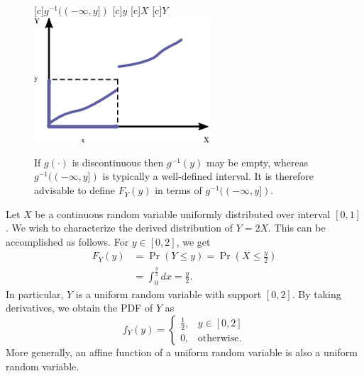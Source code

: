 \begin{figure}[ht]
\begin{center}
\begin{psfrags}
[c]{$g^{-1} ((-\infty, y])$}
[c]{$y$}
[c]{$X$}
[c]{$Y$}
\includegraphics[width=6.5cm]{Figures/9Chapter/Discontinuous}
\end{psfrags}
\caption{If $g(\cdot)$ is discontinuous then $g^{-1} (y)$ may be empty, whereas $g^{-1} ((-\infty, y])$ is typically a well-defined interval.
It is therefore advisable to define $F_Y (y)$ in terms of $g^{-1} ((-\infty, y])$.}
\end{center}
\end{figure}

\begin{example}
Let $X$ be a continuous random variable uniformly distributed over interval $[0, 1]$.
We wish to characterize the derived distribution of $Y = 2X$.
This can be accomplished as follows.
For $y \in [0, 2]$, we get
\begin{equation*}
\begin{split}
F_Y(y) &= \Pr (Y \leq y) = \Pr \left( X \leq \frac{y}{2} \right) \\
&= \int_0^{\frac{y}{2}} dx = \frac{y}{2} .
\end{split}
\end{equation*}
In particular, $Y$ is a uniform random variable with support $[0, 2]$.
By taking derivatives, we obtain the PDF of $Y$ as
\begin{equation*}
f_Y(y) = \begin{cases} \frac{1}{2}, & y \in [0, 2] \\
0, & \text{otherwise}. \end{cases}
\end{equation*}
More generally, an affine function of a uniform random variable is also a uniform random variable.
\end{example}

